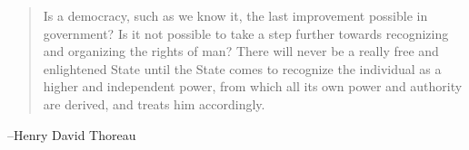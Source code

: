 \documentclass[letterpaper, landscape]{exam}
\begin{document}
  \else
    \vspace{10 cm}
    \begin{quote}
      \begin{em}
        Is a democracy, such as we know it, the last improvement possible in
        government? Is it not possible to take a step further towards
        recognizing and organizing the rights of man? There will never be a
        really free and enlightened State until the State comes to recognize the
        individual as a higher and independent power, from which all its own
        power and authority are derived, and treats him accordingly. 
      \end{em}
    \end{quote}
    \hspace{1 cm} --Henry David Thoreau
  \fi
\end{document}
